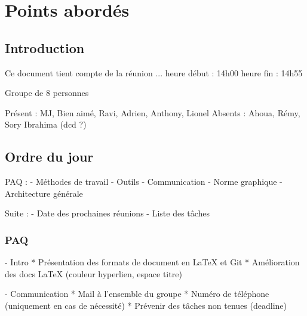 \documentclass[11pt,fleqn]{report}
\begin{document}
\ZMakeCover


\ZMakeTableOfContents

\chapter{Points abordés}

\section{Introduction}

Ce document tient compte de la réunion ...
heure début : 14h00
heure fin : 14h55

Groupe de 8 personnes

Présent : MJ, Bien aimé, Ravi, Adrien, Anthony, Lionel
Absents : Ahoua, Rémy, Sory Ibrahima (dcd ?)

\section{Ordre du jour}

PAQ :
  - Méthodes de travail
  - Outils
  - Communication
  - Norme graphique
  - Architecture générale
    
Suite :
 - Date des prochaines réunions
 - Liste des tâches

\subsection{PAQ}

- Intro
  * Présentation des formats de document en LaTeX et Git
  * Amélioration des docs LaTeX (couleur hyperlien, espace titre)

- Communication
  * Mail à l'ensemble du groupe
  * Numéro de téléphone (uniquement en cas de nécessité)
  * Prévenir des tâches non tenues (deadline)
\end{document}

